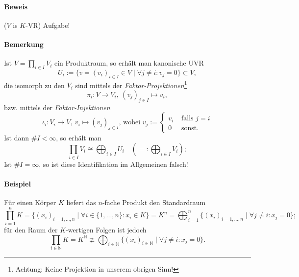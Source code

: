  	\paragraph{Beweis} ($V$ is $K$-VR) Aufgabe!

 	\paragraph{Bemerkung}
 		Ist $V = \prod_{i\in I} V_i$ ein Produktraum, so erhält man kanonische UVR
 		\[
 			U_i:=\{v=(v_i)_{i\in I}\in V\mid\forall j \neq i:v_j = 0\}\subset V,
 		\]
 		die isomorph zu den $V_i$ sind mittels der \emph{Faktor-Projektionen}\footnote{Achtung: Keine Projektion in unserem obrigen Sinn!}
 		\[
 			\pi_i:V\to V_i,\ (v_j)_{j\in I} \mapsto v_i,
 		\]
 		bzw. mittels der \emph{Faktor-Injektionen}
 		\[
 			\iota_i:V_i\to V,\ v_i \mapsto(v_j)_{j\in I}\text{, wobei }v_j :=
 			\begin{cases}
 				v_i & \text{ falls } j=i \\
 				0   & \text{ sonst.}
 			\end{cases}
 		\]
 		Ist dann $\# I < \infty$, so erhält man
 		\[
 			\prod_{i\in I} V_i\cong \bigoplus_{i\in I}U_i\quad (=: \bigoplus_{i\in I}V_i);
 		\]
 		Ist $\#I=\infty$, so ist diese Identifikation im Allgemeinen falsch!

 	\paragraph{Beispiel}
 		Für einen Körper $ K $ liefert das $ n $-fache Produkt den Standardraum
 		\[
 			\prod_{i=1}^{n}K = \{(x_i)_{i = 1,...,n}\mid\forall i \in \{1,...,n\}: x_i \in K\} = K^n = \bigoplus_{i=1}^n\{(x_i)_{i = 1,...,n}\mid\forall j\neq i: x_j = 0\};
 		\]
 		für den Raum der $K$-wertigen Folgen ist jedoch
 		\[
 			\prod_{i\in \mathbb{N}}K=K^{\mathbb{N}}\ncong\bigoplus_{i\in \mathbb{N}}\{(x_i)_{i\in \mathbb{N}}\mid\forall j\neq i: x_j=0\}.
 		\]


